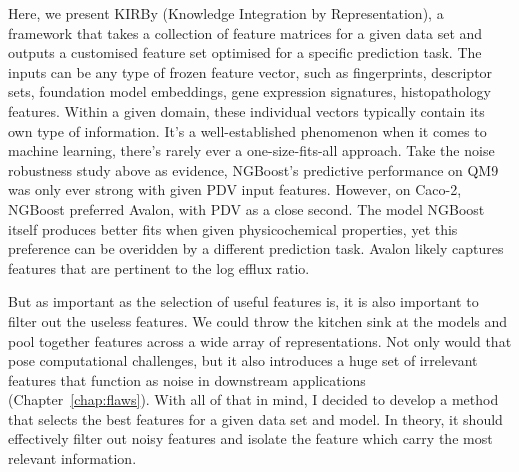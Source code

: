 
Here, we present KIRBy (Knowledge Integration by Representation), a framework that takes a collection of feature matrices for a given data set and outputs a customised feature set optimised for a specific prediction task. The inputs can be any type of frozen feature vector, such as fingerprints, descriptor sets, foundation model embeddings, gene expression signatures, histopathology features. Within a given domain, these individual vectors typically contain its own type of information. It's a well-established phenomenon when it comes to machine learning, there's rarely ever a one-size-fits-all approach. Take the noise robustness study above as evidence, NGBoost's predictive performance on QM9 was only ever strong with given PDV input features. However, on Caco-2, NGBoost preferred Avalon, with PDV as a close second. The model NGBoost itself produces better fits when given physicochemical properties, yet this preference can be overidden by a different prediction task. Avalon likely captures features that are pertinent to the log efflux ratio.

But as important as the selection of useful features is, it is also important to filter out the useless features. We could throw the kitchen sink at the models and pool together features across a wide array of representations. Not only would that pose computational challenges, but it also introduces a huge set of irrelevant features that function as noise in downstream applications (Chapter~\ref{chap:flaws}). With all of that in mind, I decided to develop a method that selects the best features for a given data set and model. In theory, it should effectively filter out noisy features and isolate the feature which carry the most relevant information.

